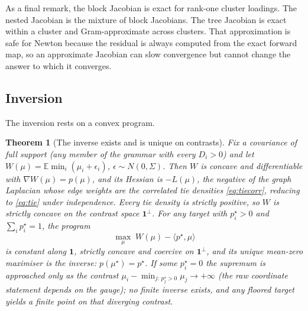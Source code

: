 \documentclass[11pt]{article}
\newtheorem{theorem}{Theorem}
\newcommand{\E}{\mathbb{E}}
\begin{document}
As a final remark, the block Jacobian is exact for
rank-one cluster loadings. The nested Jacobian is the
mixture of block Jacobians. The tree Jacobian is exact within a cluster
and Gram-approximate across clusters. That approximation is safe for
Newton because the residual is always computed from the exact forward
map, so an approximate Jacobian can slow convergence but cannot change the
answer to which it converges.

\subsection{Inversion}

The inversion rests on a convex program.

\begin{theorem}[The inverse exists and is unique on contrasts]\label{thm:inverse}
Fix a covariance of full support (any member of the grammar with every
$D_i>0$) and let $W(\mu)=\E\min_i(\mu_i+\epsilon_i)$,
$\epsilon\sim N(0,\Sigma)$. Then $W$ is concave and differentiable with
$\nabla W(\mu)=p(\mu)$, and its Hessian is $-L(\mu)$, the negative of the
graph Laplacian whose edge weights are the correlated tie densities
\eqref{eq:tiecorr}, reducing to \eqref{eq:tie} under independence.
Every tie density is strictly positive, so $W$ is strictly concave on the
contrast space $\mathbf{1}^{\perp}$. For any target with $p^{\star}_i>0$
and $\sum_i p^{\star}_i=1$, the program
\[
\max_{\mu}\; W(\mu)-\langle p^{\star},\mu\rangle
\]
is constant along $\mathbf{1}$, strictly concave and coercive on
$\mathbf{1}^{\perp}$, and its unique mean-zero maximiser is the inverse:
$p(\mu^{\star})=p^{\star}$. If some $p^{\star}_i=0$ the supremum is
approached only as the contrast
$\mu_i-\min_{j:\,p^{\star}_j>0}\mu_j\to+\infty$ (the raw coordinate
statement depends on the gauge); no finite inverse exists, and any
floored target yields a finite point on that diverging contrast.
\end{theorem}
\end{document}

